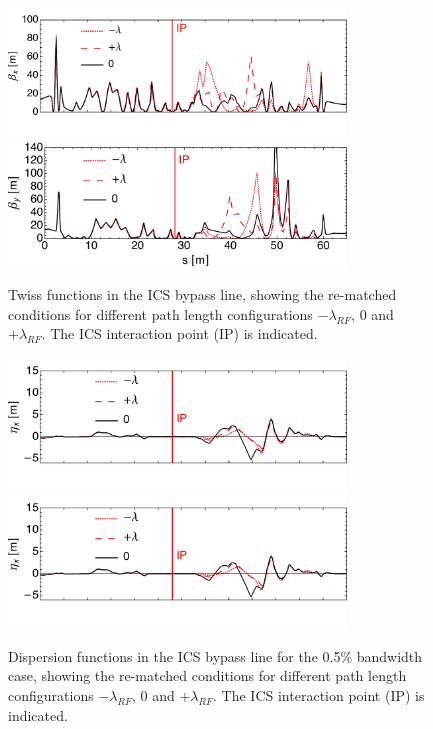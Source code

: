 \documentclass[../main.tex]{subfiles}
\begin{document}
\begin{figure}[!htb]
    \centering
    \includegraphics[width=0.8\textwidth]{Figures/CBETA_Inverse_Compton_Source_Design/twissplotx.pdf}
    \includegraphics[width=0.8\textwidth]{Figures/CBETA_Inverse_Compton_Source_Design/twissploty.pdf}
    \caption{Twiss functions in the ICS bypass line, showing the re-matched conditions for different path length configurations $-\lambda_{RF}$, $0$ and $+\lambda_{RF}$. The ICS interaction point (IP) is indicated.}
    \label{fig:CBETA_ICS_Twiss}
\end{figure}

\begin{figure}[!htb]
\centering
\includegraphics[width=0.8\textwidth]{Figures/CBETA_Inverse_Compton_Source_Design/dispplotx.pdf}
\includegraphics[width=0.8\textwidth]{Figures/CBETA_Inverse_Compton_Source_Design/dispplotx.pdf}
\caption{Dispersion functions in the ICS bypass line for the 0.5\% bandwidth case, showing the re-matched conditions for different path length configurations $-\lambda_{RF}$, $0$ and $+\lambda_{RF}$. The ICS interaction point (IP) is indicated.}
\label{fig:CBETA_ICS_dispersion}
\end{figure}
\end{document}
